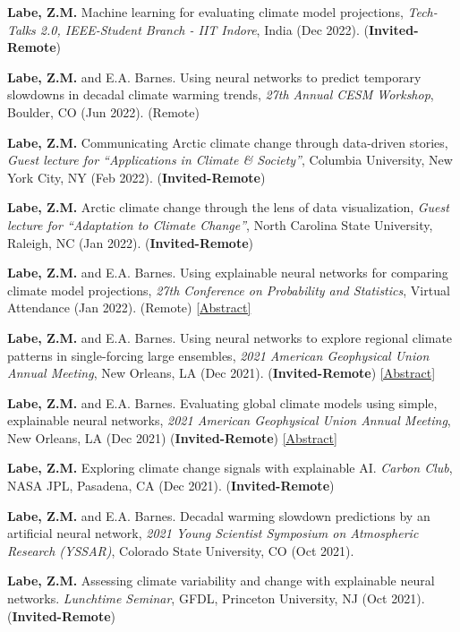 \documentclass[margin,line,palatino,courier,10pt]{res}
\begin{document}
\begin{resume}
\begin{etaremune}[leftmargin=0in,topsep=0in,parsep=0in]
\item \textbf{Labe, Z.M.} Machine learning for evaluating climate model projections, \textit{Tech-Talks 2.0, IEEE-Student Branch - IIT Indore}, India (Dec 2022). (\textbf{Invited-Remote})
\item \textbf{Labe, Z.M.} and E.A. Barnes. Using neural networks to predict temporary slowdowns in decadal climate warming trends, \textit{27th Annual CESM Workshop}, Boulder, CO (Jun 2022). (Remote)
\item \textbf{Labe, Z.M.} Communicating Arctic climate change through data-driven stories, \textit{Guest lecture for ``Applications in Climate \& Society''}, Columbia University, New York City, NY (Feb 2022). (\textbf{Invited-Remote}) 
\item \textbf{Labe, Z.M.} Arctic climate change through the lens of data visualization, \textit{Guest lecture for ``Adaptation to Climate Change''}, North Carolina State University, Raleigh, NC (Jan 2022). (\textbf{Invited-Remote}) 
\item \textbf{Labe, Z.M.} and E.A. Barnes. Using explainable neural networks for comparing climate model projections, \textit{27th Conference on Probability and Statistics}, Virtual Attendance (Jan 2022). (Remote) \href{https://ams.confex.com/ams/102ANNUAL/meetingapp.cgi/Paper/392538}{[Abstract]}
\item \textbf{Labe, Z.M.} and E.A. Barnes. Using neural networks to explore regional climate patterns in single-forcing large ensembles, \textit{2021 American Geophysical Union Annual Meeting}, New Orleans, LA (Dec 2021). (\textbf{Invited-Remote}) \href{https://agu.confex.com/agu/fm21/meetingapp.cgi/Paper/798039}{[Abstract]}
\item \textbf{Labe, Z.M.} and E.A. Barnes. Evaluating global climate models using simple, explainable neural networks, \textit{2021 American Geophysical Union Annual Meeting}, New Orleans, LA (Dec 2021) (\textbf{Invited-Remote}) \href{https://agu.confex.com/agu/fm21/meetingapp.cgi/Paper/797879}{[Abstract]}
\item \textbf{Labe, Z.M.} Exploring climate change signals with explainable AI. \textit{Carbon Club}, NASA JPL, Pasadena, CA (Dec 2021). (\textbf{Invited-Remote})
\item \textbf{Labe, Z.M.} and E.A. Barnes. Decadal warming slowdown predictions by an artificial neural network, \textit{2021 Young Scientist Symposium on Atmospheric Research (YSSAR)}, Colorado State University, CO (Oct 2021).
\item \textbf{Labe, Z.M.} Assessing climate variability and change with explainable neural networks. \textit{Lunchtime Seminar}, GFDL, Princeton University, NJ (Oct 2021). (\textbf{Invited-Remote})

\end{etaremune}
\end{resume}
\end{document}
